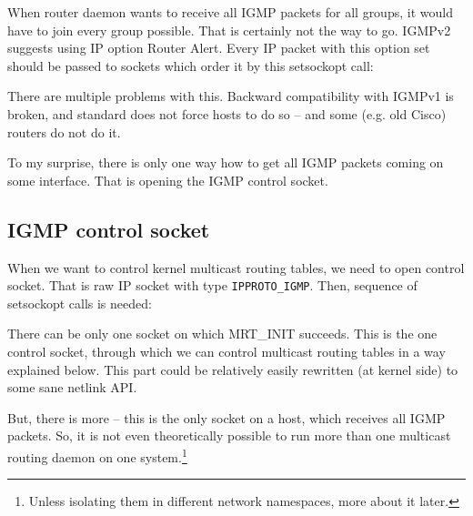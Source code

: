 When router daemon wants to receive all IGMP packets for all groups, it
would have to join every group possible. That is certainly not the way to go.
IGMPv2 suggests using IP option Router Alert. Every IP packet with this option
set should be passed to sockets which order it by this setsockopt call:


\noindent There are multiple problems with this. Backward compatibility with
IGMPv1 is broken, and standard does not force hosts to do so -- and some (e.g.
old Cisco) routers do not do it.

To my surprise, there is only one way how to get all IGMP packets coming on
some interface. That is opening the IGMP control socket.

\subsection{IGMP control socket}

When we want to control kernel multicast routing tables, we need to open
control socket. That is raw IP socket with type \texttt{IPPROTO\_IGMP}. Then,
sequence of setsockopt calls is needed:


There can be only one socket on which MRT\_INIT succeeds. This is the one
control socket, through which we can control multicast routing tables in a way
explained below. This part could be relatively easily rewritten (at kernel
side) to some sane netlink API.

But, there is more -- this is the only socket on a host, which receives all
IGMP packets. So, it is not even theoretically possible to run more than one
multicast routing daemon on one system.\footnote{Unless isolating them in
different network namespaces, more about it later.}
